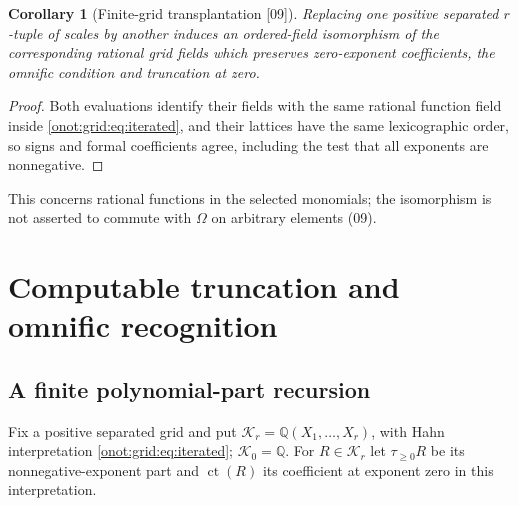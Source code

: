\documentclass[11pt,oneside]{article}
\numberwithin{equation}{section}
\newtheorem{corollary}[corollary]{Corollary}
\theoremstyle{definition}
\theoremstyle{remark}
\newcommand{\Q}{\mathbb Q}
\newcommand{\KG}{\mathcal K}
\newcommand{\ct}{\operatorname{ct}}
\newcommand{\Om}{\Omega}
\newcommand{\tr}[1]{\tau_{\ge #1}}
\newcommand{\src}[1]{\textup{\textsf{\small[#1]}}}
\begin{document}
\begin{corollary}[Finite-grid transplantation \src{09}]\label{onot:grid:cor:transplant}
Replacing one positive separated $r$-tuple of scales by another induces an
ordered-field isomorphism of the corresponding rational grid fields which
preserves zero-exponent coefficients, the omnific condition and truncation at
zero.
\end{corollary}
\begin{proof}
Both evaluations identify their fields with the same rational function field
inside \eqref{onot:grid:eq:iterated}, and their lattices have the same
lexicographic order, so signs and formal coefficients agree, including the test
that all exponents are nonnegative.
\end{proof}
This concerns rational functions in the selected monomials; the isomorphism is
not asserted to commute with $\Om$ on arbitrary elements (09).

\section{Computable truncation and omnific recognition}\label{onot:grid:sec:truncation}

\subsection{A finite polynomial-part recursion}

Fix a positive separated grid and put $\KG_r=\Q(X_1,\ldots,X_r)$, with Hahn
interpretation \eqref{onot:grid:eq:iterated}; $\KG_0=\Q$. For $R\in\KG_r$ let
$\tr0 R$ be its nonnegative-exponent part and $\ct(R)$ its coefficient at
exponent zero in this interpretation.
\end{document}
